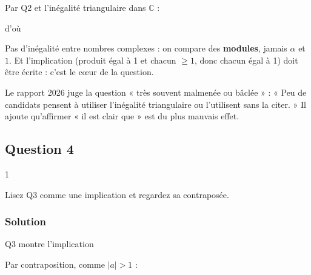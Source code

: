 \documentclass[11pt,a4paper]{article}
\newcommand{\equationajustee}[1]{%
  \sbox{\boiteequation}{$\displaystyle #1$}%
  \ifdim\wd\boiteequation>\linewidth
    \[\resizebox{\linewidth}{!}{\usebox{\boiteequation}}\]%
  \else
    \[#1\]%
  \fi}
\begin{document}
\equationajustee{|\alpha|=|\beta|=1.}

Par Q2 et l'inégalité triangulaire dans \(\mathbb C\) :

\equationajustee{\begin{aligned}2|a|&=|\alpha+\beta|\\ &\le|\alpha|+|\beta|\\ &=2,\end{aligned}}

d'où

\equationajustee{\boxed{|a|\le1.}}

\begin{piege}

Pas d'inégalité entre nombres complexes : on compare des \textbf{modules}, jamais \(\alpha\) et \(1\). Et l'implication (produit égal à 1 et chacun \(\ge1\), donc chacun égal à 1) doit être écrite : c'est le cœur de la question.

\end{piege}

\begin{jury}

Le rapport 2026 juge la question « très souvent malmenée ou bâclée » : « Peu de candidats pensent à utiliser l'inégalité triangulaire ou l'utilisent sans la citer. » Il ajoute qu'affirmer « il est clair que » est du plus mauvais effet.

\end{jury}

\hypertarget{question-4}{%
\subsection{Question 4}\label{question-4}}

\begin{indication}{1}

Lisez Q3 comme une implication et regardez sa contraposée.

\end{indication}

\hypertarget{solution-3}{%
\subsubsection{Solution}\label{solution-3}}

Q3 montre l'implication

\equationajustee{\big(|\alpha|\ge1\ \text{et}\ |\beta|\ge1\big)\Longrightarrow|a|\le1.}

Par contraposition, comme \(|a|>1\) :
\end{document}
